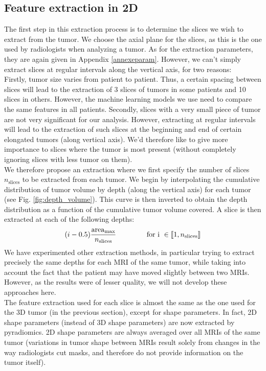 \documentclass[preprint,12pt]{elsarticle}
\begin{document}
\subsection{Feature extraction in 2D}
\label{sec:2D}
\noindent The first step in this extraction process is to determine the slices we wish to extract from the tumor. We choose the axial plane for the slices, as this is the one used by radiologists when analyzing a tumor. As for the extraction parameters, they are again given in Appendix \ref{annexeparam}. However, we can't simply extract slices at regular intervals along the vertical axis, for two reasons:\\
\indent Firstly, tumor size varies from patient to patient. Thus, a certain spacing between slices will lead to the extraction of 3 slices of tumors in some patients and 10 slices in others. However, the machine learning models we use need to compare the same features in all patients. Secondly, slices with a very small piece of tumor are not very significant for our analysis. However, extracting at regular intervals will lead to the extraction of such slices at the beginning and end of certain elongated tumors (along vertical axis). We'd therefore like to give more importance to slices where the tumor is most present (without completely ignoring slices with less tumor on them).\\
\indent We therefore propose an extraction where we first specify the number of slices $n_{\text{slices}}$ to be extracted from each tumor. We begin by interpolating the cumulative distribution of tumor volume by depth (along the vertical axis) for each tumor (see Fig. \ref{fig:depth_volume}). This curve is then inverted to obtain the depth distribution as a function of the cumulative tumor volume covered. A slice is then extracted at each of the following depths: 
\begin{equation}
(i-0.5) \displaystyle{\frac{\text{area}_{\text{max}}}{n_{\text{slices}}}} \hspace{1.5 cm} \text{for i } \in \llbracket 1,n_{\text{slices}}  \rrbracket
\end{equation}
We have experimented other extraction methods, in particular trying to extract precisely the same depths for each MRI of the same tumor, while taking into account the fact that the patient may have moved slightly between two MRIs. However, as the results were of lesser quality, we will not develop these approaches here.\\
\indent The feature extraction used for each slice is almost the same as the one used for the 3D tumor (in the previous section), except for shape parameters. In fact, 2D shape parameters (instead of 3D shape parameters) are now extracted by pyradiomics. 2D shape parameters are always averaged over all MRIs of the same tumor (variations in tumor shape between MRIs result solely from changes in the way radiologists cut masks, and therefore do not provide information on the tumor itself).\\
\end{document}
